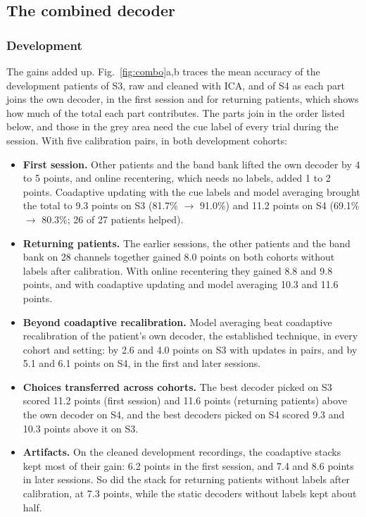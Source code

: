 \documentclass{ieeeaccess}
\begin{document}
\subsection{The combined decoder}\label{sec:res-combo}

\subsubsection{Development} The gains added up. Fig.~\ref{fig:combo}a,b traces the mean accuracy of the development patients of S3, raw and cleaned with ICA, and of S4 as each part joins the own decoder, in the first session and for returning patients, which shows how much of the total each part contributes. The parts join in the order listed below, and those in the grey area need the cue label of every trial during the session. With five calibration pairs, in both development cohorts:
\begin{itemize}
\item \textbf{First session.} Other patients and the band bank lifted the own decoder by 4 to 5 points, and online recentering, which needs no labels, added 1 to 2 points. Coadaptive updating with the cue labels and model averaging brought the total to 9.3 points on S3 (81.7\% $\rightarrow$ 91.0\%) and 11.2 points on S4 (69.1\% $\rightarrow$ 80.3\%; 26 of 27 patients helped).
\item \textbf{Returning patients.} The earlier sessions, the other patients and the band bank on 28 channels together gained 8.0 points on both cohorts without labels after calibration. With online recentering they gained 8.8 and 9.8 points, and with coadaptive updating and model averaging 10.3 and 11.6 points.
\item \textbf{Beyond coadaptive recalibration.} Model averaging beat coadaptive recalibration of the patient's own decoder, the established technique, in every cohort and setting: by 2.6 and 4.0 points on S3 with updates in pairs, and by 5.1 and 6.1 points on S4, in the first and later sessions.
\item \textbf{Choices transferred across cohorts.} The best decoder picked on S3 scored 11.2 points (first session) and 11.6 points (returning patients) above the own decoder on S4, and the best decoders picked on S4 scored 9.3 and 10.3 points above it on S3.
\item \textbf{Artifacts.} On the cleaned development recordings, the coadaptive stacks kept most of their gain: 6.2 points in the first session, and 7.4 and 8.6 points in later sessions. So did the stack for returning patients without labels after calibration, at 7.3 points, while the static decoders without labels kept about half.
\end{itemize}
\end{document}
